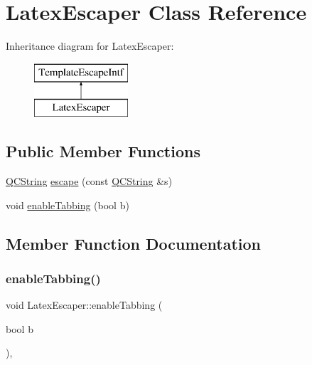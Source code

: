 \hypertarget{class_latex_escaper}{}\section{Latex\+Escaper Class Reference}
\label{class_latex_escaper}
Inheritance diagram for Latex\+Escaper\+:\begin{figure}[H]
\begin{center}
\leavevmode
\includegraphics[height=2.000000cm]{class_latex_escaper}
\end{center}
\end{figure}
\subsection*{Public Member Functions}
\begin{DoxyCompactItemize}
\item 
\mbox{\hyperlink{class_q_c_string}{Q\+C\+String}} \mbox{\hyperlink{class_latex_escaper_ac6db140f510d46ce4f169546adbc5cb6}{escape}} (const \mbox{\hyperlink{class_q_c_string}{Q\+C\+String}} \&s)
\item 
void \mbox{\hyperlink{class_latex_escaper_a224cb832481438f57b24c2a8159ab67f}{enable\+Tabbing}} (bool b)
\end{DoxyCompactItemize}


\subsection{Member Function Documentation}
\mbox{\label{class_latex_escaper_a224cb832481438f57b24c2a8159ab67f}} 
\subsubsection{\texorpdfstring{enableTabbing()}{enableTabbing()}}
{\footnotesize\ttfamily void Latex\+Escaper\+::enable\+Tabbing (\begin{DoxyParamCaption}\item[{bool}]{b }\end{DoxyParamCaption})\hspace{0.3cm}{\ttfamily [inline]}, {\ttfamily [virtual]}}

